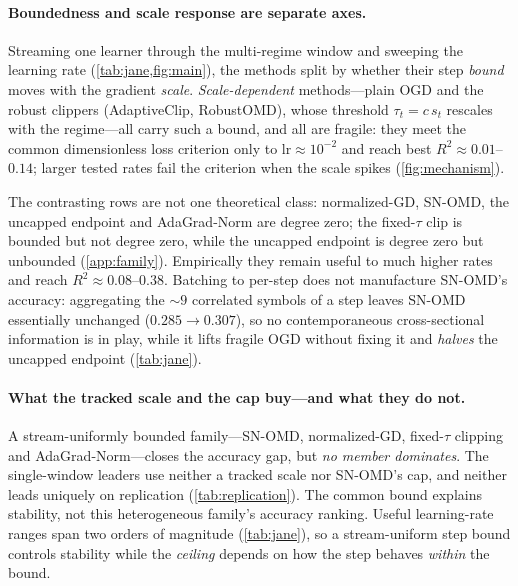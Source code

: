 \documentclass{article}
\begin{document}
\paragraph{Boundedness and scale response are separate axes.} Streaming one learner
through the multi-regime window and sweeping the learning rate
(\cref{tab:jane,fig:main}), the methods split by whether their step \emph{bound} moves with the
gradient \emph{scale}. \emph{Scale-dependent} methods---plain OGD and the robust clippers
(AdaptiveClip, RobustOMD), whose threshold $\tau_t=c\,s_t$ rescales with the regime---all carry
such a bound, and all are fragile: they meet the common dimensionless loss criterion only to
$\mathrm{lr}\approx10^{-2}$ and reach best $R^2\approx0.01$--$0.14$; larger tested rates fail
the criterion when the scale spikes
(\cref{fig:mechanism}).

The contrasting rows are not one theoretical class: normalized-GD, SN-OMD, the uncapped
endpoint and AdaGrad-Norm are degree zero; the fixed-$\tau$ clip is bounded but not degree zero,
while the uncapped endpoint is degree zero but unbounded (\cref{app:family}). Empirically they
remain useful to much higher rates and reach $R^2\approx0.08$--$0.38$. Batching to
per-step does not manufacture SN-OMD's accuracy: aggregating the $\sim\!9$ correlated symbols
of a step leaves SN-OMD essentially unchanged ($0.285\!\to\!0.307$), so no contemporaneous
cross-sectional information is in play, while it lifts fragile OGD without fixing it and
\emph{halves} the uncapped endpoint (\cref{tab:jane}).

\paragraph{What the tracked scale and the cap buy---and what they do not.}
A stream-uniformly bounded family---SN-OMD, normalized-GD, fixed-$\tau$ clipping and
AdaGrad-Norm---closes the accuracy gap, but \emph{no member dominates}. The single-window
leaders use neither a tracked scale nor SN-OMD's cap, and neither leads uniquely on replication
(\cref{tab:replication}). The common bound explains stability, not this heterogeneous family's
accuracy ranking. Useful learning-rate ranges span two orders of magnitude
(\cref{tab:jane}), so a stream-uniform step bound controls stability while the \emph{ceiling}
depends on how the step behaves \emph{within} the bound.
\end{document}
